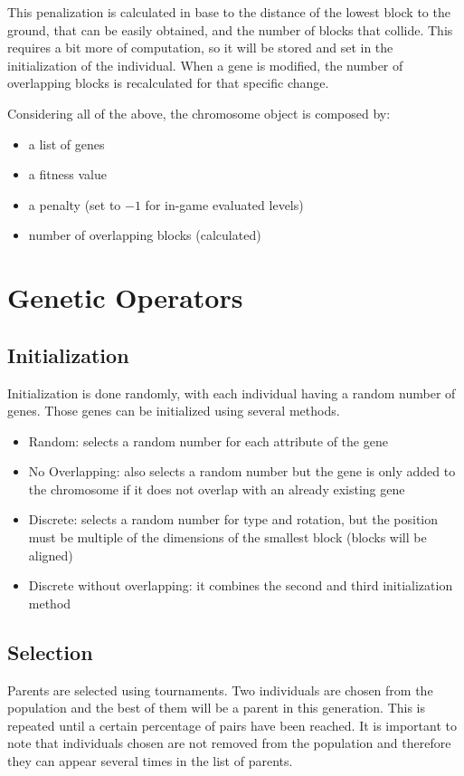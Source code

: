 This penalization is calculated in base to the distance of the lowest block to the ground, that can be easily obtained, and the number of blocks that collide. This requires a bit more of computation, so it will be stored and set in the initialization of the individual. When a gene is modified, the number of overlapping blocks is recalculated for that specific change. 

Considering all of the above, the chromosome object is composed by:
\begin{itemize}
	\item a list of genes
	\item a fitness value
	\item a penalty (set to $-1$ for in-game evaluated levels)
	\item number of overlapping blocks (calculated) 
\end{itemize}

\section{Genetic Operators}

\subsection{Initialization}

Initialization is done randomly, with each individual having a random number of genes. Those genes can be initialized using several methods. 

\begin{itemize}
	\item Random: selects a random number for each attribute of the gene
	\item No Overlapping: also selects a random number but the gene is only added to the chromosome if it does not overlap with an already existing gene
	\item Discrete: selects a random number for type and rotation, but the position must be multiple of the dimensions of the smallest block (blocks will be aligned)
	\item Discrete without overlapping: it combines the second and third initialization method
\end{itemize}

\subsection{Selection}

Parents are selected using tournaments. Two individuals are chosen from the population and the best of them will be a parent in this generation. This is repeated until a certain percentage of pairs have been reached. It is important to note that individuals chosen are not removed from the population and therefore they can appear several times in the list of parents. 

